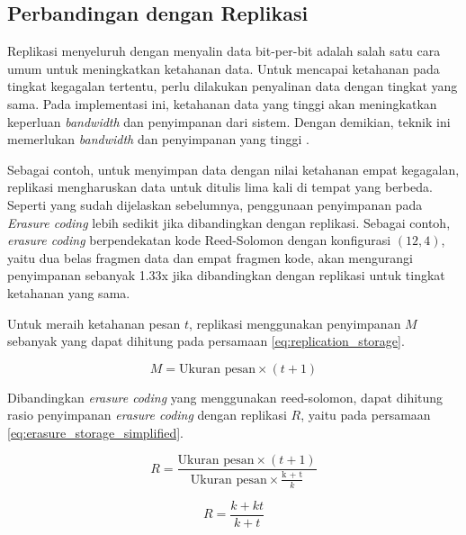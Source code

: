 \subsection{Perbandingan dengan Replikasi}

Replikasi menyeluruh dengan menyalin data bit-per-bit adalah salah satu cara umum untuk meningkatkan ketahanan data. Untuk mencapai ketahanan pada tingkat kegagalan tertentu, perlu dilakukan penyalinan data dengan tingkat yang sama. Pada implementasi ini, ketahanan data yang tinggi akan meningkatkan keperluan \textit{bandwidth} dan penyimpanan dari sistem. Dengan demikian, teknik ini memerlukan \textit{bandwidth} dan penyimpanan yang tinggi  \parencite{weatherspoon2002erasure}.

Sebagai contoh, untuk menyimpan data dengan nilai ketahanan empat kegagalan, replikasi mengharuskan data untuk ditulis lima kali di tempat yang berbeda. Seperti yang sudah dijelaskan sebelumnya, penggunaan penyimpanan pada \textit{Erasure coding} lebih sedikit jika dibandingkan dengan replikasi. Sebagai contoh, \textit{erasure coding} berpendekatan kode Reed-Solomon dengan konfigurasi $(12, 4)$, yaitu dua belas fragmen data dan empat fragmen kode, akan mengurangi penyimpanan sebanyak 1.33x jika dibandingkan dengan replikasi untuk tingkat ketahanan yang sama.

Untuk meraih ketahanan pesan $t$, replikasi menggunakan penyimpanan $M$ sebanyak yang dapat dihitung pada persamaan \ref{eq:replication_storage}.

\begin{equation}
    M = \text{Ukuran pesan} \times (t + 1)
    \label{eq:replication_storage}
\end{equation}

Dibandingkan \textit{erasure coding} yang menggunakan reed-solomon, dapat dihitung rasio penyimpanan \textit{erasure coding} dengan replikasi $R$, yaitu pada persamaan \ref{eq:erasure_storage_simplified}.

\begin{equation}
    R = \frac{\text{Ukuran pesan} \times (t + 1)}{\text{Ukuran pesan} \times \frac{\text{k + t}}{k}}
    \label{eq:erasure_storage}
\end{equation}

\begin{equation}
    R = \frac{k + kt}{k + t}
    \label{eq:erasure_storage_simplified}
\end{equation}



